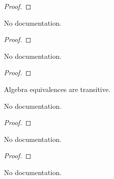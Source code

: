 \begin{proof}
    \leanok
\end{proof}

\begin{theorem}\label{ValRingEquiv.symm_surjective}
        \leanok
                No documentation.
    \end{theorem}

\begin{proof}
    \leanok
\end{proof}

\begin{theorem}\label{ValRingEquiv.toEquiv_symm}
        \leanok
                No documentation.
    \end{theorem}

\begin{proof}
    \leanok
\end{proof}

\begin{definition}\label{ValAlgEquiv.trans}
        \leanok
                Algebra equivalences are transitive.
    \end{definition}

\begin{theorem}\label{ValAlgEquiv.coe_trans}
        \leanok
                No documentation.
    \end{theorem}

\begin{proof}
    \leanok
\end{proof}

\begin{theorem}\label{ValAlgEquiv.trans_apply}
        \leanok
                No documentation.
    \end{theorem}

\begin{proof}
    \leanok
\end{proof}

\begin{theorem}\label{ValRingEquiv.refl_trans}
        \leanok
                No documentation.
    \end{theorem}

